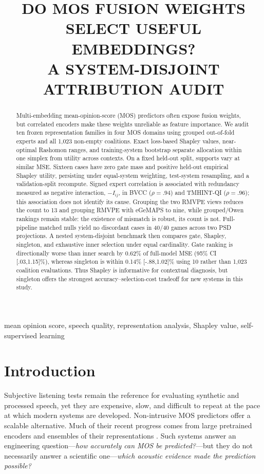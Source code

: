 \documentclass{article}
\title{DO MOS FUSION WEIGHTS SELECT USEFUL EMBEDDINGS?\\
A SYSTEM-DISJOINT ATTRIBUTION AUDIT}
\begin{document}
\ninept
\maketitle

\begin{abstract}
Multi-embedding mean-opinion-score (MOS) predictors often expose fusion
weights, but correlated encoders make these weights unreliable as feature
importance. We audit ten frozen representation families in four MOS domains
using grouped out-of-fold experts and all 1,023 non-empty coalitions. Exact
loss-based Shapley values, near-optimal Rashomon ranges, and training-system
bootstrap separate allocation within one simplex from utility across contexts.
On a fixed held-out split, supports vary at similar MSE. Sixteen cases have zero gate
mass and positive held-out empirical Shapley utility, persisting under equal-system
weighting, test-system resampling, and a validation-split recompute. Signed expert correlation is
associated with redundancy measured as negative interaction, $-I_{ij}$, in
BVCC ($\rho=.94$) and TMHINT-QI ($\rho=.96$); this association does not identify
its cause. Grouping the two RMVPE views reduces the count to 13 and grouping
RMVPE with eGeMAPS to nine, while grouped/Owen rankings remain stable: the
existence of mismatch is robust, its count is not. Full-pipeline matched nulls
yield no discordant cases in 40/40 games across two PSD projections. A nested system-disjoint benchmark
then compares gate, Shapley, singleton, and exhaustive inner selection under
equal cardinality. Gate ranking is directionally worse than inner search by
0.62\% of full-model MSE (95\% CI [.03,1.15]\%), whereas singleton is within 0.14\%
[-.88,1.02]\% using 10 rather than 1,023 coalition evaluations. Thus Shapley
is informative for contextual diagnosis, but singleton offers the strongest
accuracy--selection-cost tradeoff for new systems in this study.
\end{abstract}

\begin{keywords}
mean opinion score, speech quality, representation analysis, Shapley value,
self-supervised learning
\end{keywords}

\section{Introduction}
\label{sec:intro}

Subjective listening tests remain the reference for evaluating synthetic and
processed speech, yet they are expensive, slow, and difficult to repeat at the
pace at which modern systems are developed. Non-intrusive MOS predictors offer
a scalable alternative. Much of their recent progress comes from large
pretrained encoders and ensembles of their representations
\cite{huang2022voicemos,yang2022fusion}. Such systems answer an engineering
question---\emph{how accurately can MOS be predicted?}---but they do not
necessarily answer a scientific one---\emph{which acoustic evidence made the
prediction possible?}
\end{document}
